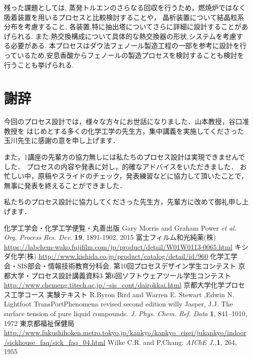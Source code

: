 \documentclass[a4j]{jsreport}
\begin{document}
残った課題としては,
蒸発トルエンのさらなる回収を行うため，燃焼炉ではなく吸着装置を用いるプロセスと比較検討することや，
晶析装置について結晶粒系分布を考慮すること,
各装置,特に抽出塔についてさらに詳細に設計することがあげられる.
また,熱交換構成について具体的な熱交換器の形状,システムを考慮する必要がある.
本プロセスはダウ法フェノール製造工程の一部を参考に設計を行っているため,安息香酸からフェノールの製造プロセスを検討することも検討を行うことも挙げられる.


\clearpage
\chapter*{謝辞}
今回のプロセス設計では，様々な方々にお世話になりました．山本教授，谷口准教授を
はじめとする多くの化学工学の先生方，集中講義を実施してくださった玉川先生に感謝の意を申し上げます．

また，1講座の先輩方の協力無しには私たちのプロセス設計は実現できませんでした．
プロセスの内容や発表に対し，的確なアドバイスをいただきました．
お忙しい中，原稿やスライドのチェック，発表練習などに協力して頂いたことで，無事に発表を終えることができました．

私たちのプロセス設計に協力してくださった先生方，先輩方に改めて御礼申し上げます．


\clearpage

\begin{thebibliography}{10}
     化学工学会・化学工学便覧・丸善出版
     Gary Morris and  Graham Power \textit{et al.  Org. Process Res. Dev.} \textbf{19}, 1891-1902, 2015
     富士フィルム和光純薬(株) \url{https://labchem-wako.fujifilm.com/jp/product/detail/W01W0113-0065.html}
     キシダ化学(株) \url{http://www.kishida.co.jp/product/catalog/detail/id/960}
     化学工学会・SIS部会・情報技術教育分科会, 第10回プロセスデザイン学生コンテスト
     京都大学・プロセス設計講義資料3
     第6回ソフトウェアツール学生コンテスト \url{http://www.chemeng.titech.ac.jp/~sis_cont/dairokkai.html}
     京都大学化学プロセス工学コース 実験テキスト
     R.Byron Bird and Warren E. Stewart ,Edwin N. Lightfoot   TransPortPhenomena revised second edition   willy
     Jasper, J.J. The surface tension of pure liquid compounds. \textit{J. Phys. Chem. Ref. Data} \textbf{1}, 841–1010, 1972
    東京都福祉保健局 \url{http://www.fukushihoken.metro.tokyo.jp/kankyo/kankyo_eisei/jukankyo/indoor/sickhouse_faq/sick_faq_04.html}
    Wilke C.R. and P.Chang: \textit{AIChE J.},\textbf{1}, 264, 1955
  \end{thebibliography}
\end{document}
